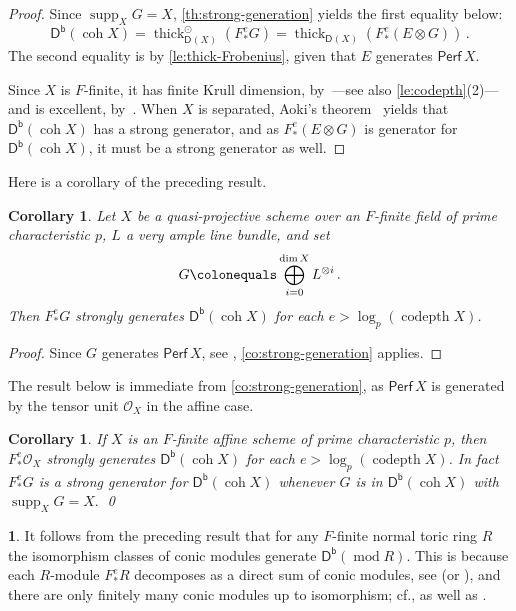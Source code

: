 \documentclass{amsart}
\newcommand{\dcat}[2][]{\cat{D}_{#1}(#2)}
\newcommand{\perf}[1]{\mathsf{Perf}\,#1}
\newcommand{\coh}{\operatorname{coh}}
\newcommand{\dbcat}[1]{\cat{D}^{\mathsf{b}}(#1)}
\newcommand{\mco}{\mathcal{O}}
\newcommand{\cat}[1]{{\mathsf{#1}}}
\newcommand{\codepth}{\operatorname{codepth}}
\newcommand{\rmod}{\operatorname{mod}}
\newcommand{\supp}{\operatorname{supp}}
\newcommand{\thick}{\operatorname{thick}}
\newtheorem{corollary}[subsection]{Corollary}
\theoremstyle{definition}
\newtheorem{chunk}[subsection]{}
\theoremstyle{remark}
\numberwithin{equation}{subsection}
\begin{document}
\begin{proof}
Since $\supp_X G= X$, \cref{th:strong-generation} yields the first equality below:
\[
\dbcat{\coh X}=\thick^{\odot}_{\dcat X}(F^e_*G)=\thick_{\dcat X}(F^e_*(E\otimes G))\,.
\]
The second equality is by \cref{le:thick-Frobenius}, given that $E$ generates $\perf X$. 

Since $X$ is $F$-finite, it has finite Krull dimension, by~\cite[Proposition~1.1]{Kunz:1976}---see also \cref{le:codepth}(2)---and is excellent, by~\cite[Theorem~2.5]{Kunz:1976}. When $X$ is separated, Aoki's theorem~\cite{Aoki:2021} yields that $\dbcat{\coh X}$ has a strong generator, and as $F^e_*(E\otimes G)$ is generator for $\dbcat{\coh X}$, it must be a strong generator as well.
\end{proof}

Here is a corollary of the preceding result.

\begin{corollary}
\label{co:quasi-proj}
Let $X$ be a quasi-projective scheme over an $F $-finite field of prime characteristic $p$, $L$ a very ample line bundle, and set
\[
G\colonequals \bigoplus_{i=0}^{\dim X}{L}^{\otimes i}\,.
\]
Then $F^e_*G$ strongly generates $\dbcat{\coh X}$ for each $e> \log_p(\codepth X)$.
\end{corollary}

\begin{proof}
Since $G$ generates $\perf X$, see \cite[Theorem~4]{Orlov:2009}, \cref{co:strong-generation} applies.
\end{proof}

The result below is immediate from \cref{co:strong-generation}, as $\perf X$ is generated by the tensor unit $\mco_X$ in the affine case.

\begin{corollary}
 \label{co:strong-generation-affine}
If $X$ is an $F$-finite affine scheme of prime characteristic $p$, then $F^e_*\mco_X$ strongly generates $\dbcat{\coh X}$ for each $e> \log_p(\codepth X)$. In fact $F^e_*G$ is a strong generator for $\dbcat{\coh X}$ whenever $G$ is in $\dbcat{\coh X}$ with $\supp_X G=X.$ \qed
\end{corollary}

\begin{chunk}
It follows from the preceding result that for any $F $-finite normal toric ring $R$ the isomorphism classes of conic modules generate $\dbcat{\rmod R}$. This is because each $R$-module $F ^e_*R$ decomposes as a direct sum of conic modules, see \cite[Proposition~4.15]{Faber/Muller/Smith:2019} (or \cite[section 3]{BrunsConic}), and there are only finitely many conic modules up to isomorphism; cf.\@ \cite[Corollary 4.12]{Faber/Muller/Smith:2019}, as well as \cite[Proposition 3.6]{BrunsGubeladze}.
\end{chunk}
\end{document}

